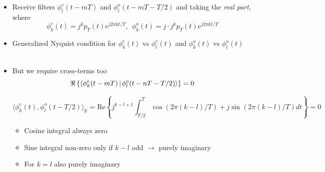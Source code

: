 \documentclass[xcolor=dvipsnames,aspectratio=169]{beamer}
\begin{document}
{\begin{itemize}
\item Receive filters $\phi^e_l(t-mT)$ and $\phi_l^o(t-mT-T/2)$ and taking the {\em real part}, where
\begin{equation*}
\phi_k^e(t) = j^k p_T(t) e^{j 2 \pi k t/T}, \ \ \phi_k^o(t)=j \cdot j^{k} p_T(t) e^{j 2 \pi k t/T}
\end{equation*} 

\pagebreak

\item Generalized Nyquist condition for $\phi^e_k(t)$ vs $\phi^e_l(t)$ and $\phi^o_k(t)$ vs $\phi^o_l(t)$\\ \ \\
\item But we require cross-terms too
\begin{equation*}
\Re\left\{\braket{ \phi^e_k(t-mT) }{ \phi^o_l (t-nT-T/2) } \right\}= 0
\end{equation*}  
\begin{theorem}
\begin{equation*}
\langle \phi_k^e(t), \phi_l^o(t-T/2) \rangle_{\mathbb R}  =  {\text {Re}} \left\{  j^{k-l+1}\int_{T/2}^T \cos (2\pi (k-l)/T) + j \sin (2\pi (k-l)/T) dt \right\} =0
\end{equation*}
\begin{itemize}
    \item Cosine integral always zero
    \item Sine integral non-zero only if $k-l$ odd $\to$ purely imaginary
    \item For $k=l$ also purely imaginary
\end{itemize}
\end{theorem}
\end{itemize}

}
\end{document}
